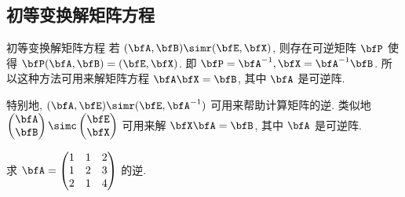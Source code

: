 \subsection{初等变换解矩阵方程}

\begin{frame}{初等变换解矩阵方程}
	\onslide<+->
	若 $(\bfA,\bfB)\simr (\bfE,\bfX)$, 则存在可逆矩阵 $\bfP$ 使得 $\bfP(\bfA,\bfB)=(\bfE,\bfX)$.
	\onslide<+->
	即 $\bfP=\bfA^{-1},\bfX=\bfA^{-1}\bfB$.
	\onslide<+->
	所以这种方法可用来解矩阵方程 $\bfA\bfX=\bfB$, 其中 $\bfA$ 是可逆阵.

	\onslide<+->
	特别地, \alert{$(\bfA,\bfE)\simr(\bfE,\bfA^{-1})$} 可用来帮助计算矩阵的逆.
	\onslide<+->
	类似地 $\begin{pmatrix}
		\bfA\\
		\bfB
	\end{pmatrix}\simc\begin{pmatrix}
		\bfE\\
		\bfX
	\end{pmatrix}$ 可用来解 $\bfX\bfA=\bfB$, 其中 $\bfA$ 是可逆阵.

	\onslide<+->
	\begin{exercise}
		求 $\bfA=\begin{pmatrix}
			1&1&2\\1&2&3\\2&1&4
		\end{pmatrix}$ 的逆.
	\end{exercise}
\end{frame}


